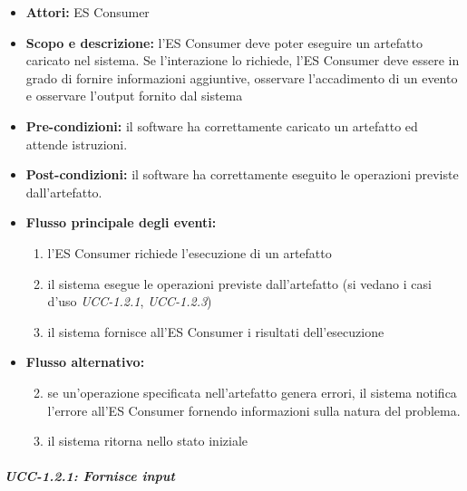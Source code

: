 \begin{itemize}
	\item \textbf{Attori:} ES Consumer
	\item \textbf{Scopo e descrizione:} l'ES Consumer deve poter eseguire un artefatto caricato nel sistema. Se l'interazione lo richiede, l'ES Consumer deve essere in grado di fornire informazioni aggiuntive, osservare l'accadimento di un evento e osservare l'output fornito dal sistema
	\item \textbf{Pre-condizioni:} il software ha correttamente caricato un artefatto ed attende istruzioni.
	\item \textbf{Post-condizioni:} il software ha correttamente eseguito le operazioni previste dall'artefatto.
	\item \textbf{Flusso principale degli eventi:}
		\begin{enumerate}
			\item l'ES Consumer richiede l'esecuzione di un artefatto
			\item il sistema esegue le operazioni previste dall'artefatto (si vedano i casi d'uso \emph{UCC-1.2.1}, \emph{UCC-1.2.3})
			\item il sistema fornisce all'ES Consumer i risultati dell'esecuzione		
		\end{enumerate}
	\item \textbf{Flusso alternativo:} 
		\begin{enumerate}
			\setcounter{enumi}{1}
			\item se un'operazione specificata nell'artefatto genera errori, il sistema notifica l'errore all'ES Consumer fornendo informazioni sulla natura del problema.
			\item il sistema ritorna nello stato iniziale
		\end{enumerate}
\end{itemize}


\subparagraph{UCC-1.2.1: Fornisce input}

